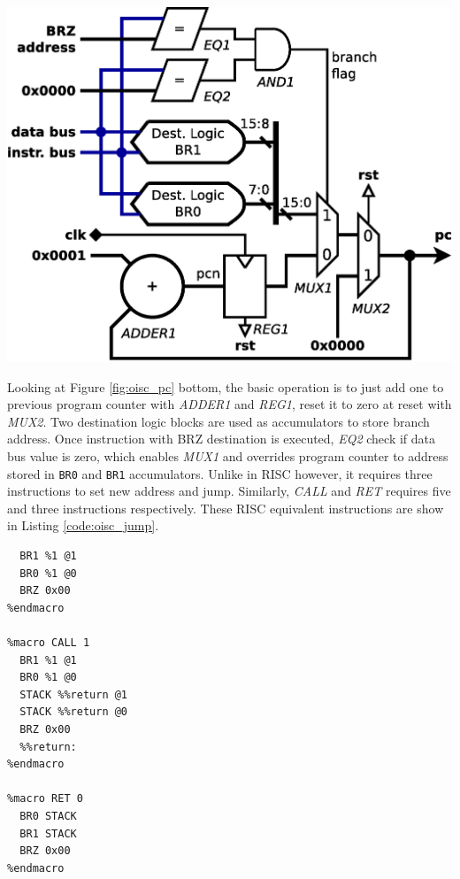 \begin{colfigure}
	\centering
	\includegraphics[width=\linewidth]{../resources/oisc_pc.eps}
	\label{fig:oisc_pc}
\end{colfigure}

Looking at Figure \ref{fig:oisc_pc} bottom, the basic operation is to just add one to previous program counter with \textit{ADDER1} and \textit{REG1}, reset it to zero at reset with \textit{MUX2}. Two destination logic blocks are used as accumulators to store branch address. Once instruction with BRZ destination is executed, \textit{EQ2} check if data bus value is zero, which enables \textit{MUX1} and overrides program counter to address stored in \texttt{BR0} and \texttt{BR1} accumulators. Unlike in RISC however, it requires three instructions to set new address and jump. Similarly, \textit{CALL} and \textit{RET} requires five and three instructions respectively. These RISC equivalent instructions are show in Listing \ref{code:oisc_jump}.

\begin{blockpage}
	\begin{lstlisting}[frame=single, emph={JUMP, CALL, RET, return}, label=code:oisc_jump, caption={OISC assembly code emulating RISC \texttt{JUMP}, \texttt{CALL} and \texttt{RET} instructions.}]
%macro JUMP 1
  BR1 %1 @1
  BR0 %1 @0
  BRZ 0x00
%endmacro

%macro CALL 1
  BR1 %1 @1
  BR0 %1 @0
  STACK %%return @1
  STACK %%return @0
  BRZ 0x00
  %%return:
%endmacro

%macro RET 0
  BR0 STACK
  BR1 STACK
  BRZ 0x00
%endmacro
	\end{lstlisting}
\end{blockpage}

